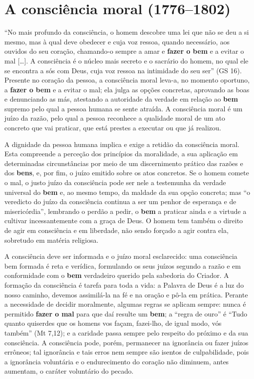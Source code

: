 \section{A consciência moral (1776--1802)}

``No mais profundo da consciência, o homem descobre uma lei que não se deu a si mesmo, mas à qual deve obedecer e cuja voz ressoa, quando necessário, aos ouvidos do seu coração, chamando-o sempre a amar e \textbf{fazer o bem} e a evitar o mal [\ldots]. A consciência é o núcleo mais secreto e o sacrário do homem, no qual ele se encontra a sós com Deus, cuja voz ressoa na intimidade do seu ser'' (GS 16). Presente no coração da pessoa, a consciência moral leva-a, no momento oportuno, a \textbf{fazer o bem} e a evitar o mal; ela julga as opções concretas, aprovando as boas e denunciando as más, atestando a autoridade da verdade em relação ao \textbf{bem} supremo pelo qual a pessoa humana se sente atraída. A consciência moral é um juízo da razão, pelo qual a pessoa reconhece a qualidade moral de um ato concreto que vai praticar, que está prestes a executar ou que já realizou.

A dignidade da pessoa humana implica e exige a retidão da consciência moral. Esta compreende a perceção dos princípios da moralidade, a sua aplicação em determinadas circunstâncias por meio de um discernimento prático das razões e dos \textbf{bens}, e, por fim, o juízo emitido sobre os atos concretos. Se o homem comete o mal, o justo juízo da consciência pode ser nele a testemunha da verdade universal do \textbf{bem} e, ao mesmo tempo, da maldade da sua opção concreta; mas ``o veredicto do juízo da consciência continua a ser um penhor de esperança e de misericórdia'', lembrando o perdão a pedir, o \textbf{bem} a praticar ainda e a virtude a cultivar incessantemente com a graça de Deus. O homem tem também o direito de agir em consciência e em liberdade, não sendo forçado a agir contra ela, sobretudo em matéria religiosa.

A consciência deve ser informada e o juízo moral esclarecido: uma consciência bem formada é reta e verídica, formulando os seus juízos segundo a razão e em conformidade com o \textbf{bem} verdadeiro querido pela sabedoria do Criador. A formação da consciência é tarefa para toda a vida: a Palavra de Deus é a luz do nosso caminho, devemos assimilá-la na fé e na oração e pô-la em prática. Perante a necessidade de decidir moralmente, algumas regras se aplicam sempre: nunca é permitido \textbf{fazer o mal} para que daí resulte um \textbf{bem}; a ``regra de ouro'' é ``Tudo quanto quiserdes que os homens vos façam, fazei-lho, de igual modo, vós também'' (Mt 7,12); e a caridade passa sempre pelo respeito do próximo e da sua consciência. A consciência pode, porém, permanecer na ignorância ou fazer juízos errôneos; tal ignorância e tais erros nem sempre são isentos de culpabilidade, pois a ignorância voluntária e o endurecimento do coração não diminuem, antes aumentam, o caráter voluntário do pecado.

